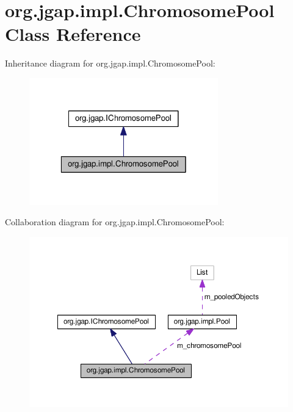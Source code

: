 \hypertarget{classorg_1_1jgap_1_1impl_1_1_chromosome_pool}{\section{org.\-jgap.\-impl.\-Chromosome\-Pool Class Reference}
\label{classorg_1_1jgap_1_1impl_1_1_chromosome_pool}
}


Inheritance diagram for org.\-jgap.\-impl.\-Chromosome\-Pool\-:
\nopagebreak
\begin{figure}[H]
\begin{center}
\leavevmode
\includegraphics[width=232pt]{classorg_1_1jgap_1_1impl_1_1_chromosome_pool__inherit__graph}
\end{center}
\end{figure}


Collaboration diagram for org.\-jgap.\-impl.\-Chromosome\-Pool\-:
\nopagebreak
\begin{figure}[H]
\begin{center}
\leavevmode
\includegraphics[width=350pt]{classorg_1_1jgap_1_1impl_1_1_chromosome_pool__coll__graph}
\end{center}
\end{figure}
